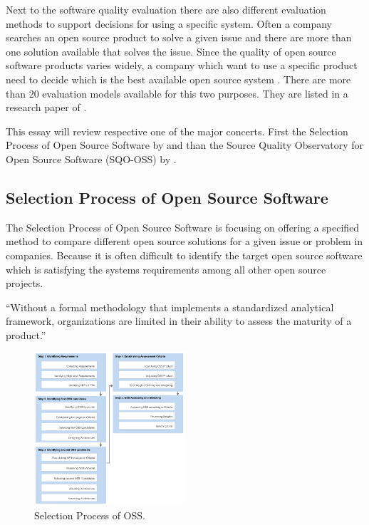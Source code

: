 \documentclass[DIV=calc,paper=a4,fontsize=9pt,twocolumn]{scrartcl}
\begin{document}
Next to the software quality evaluation there are also different evaluation methods to support decisions for using a specific system. Often a company searches an open source product to solve a given issue and there are more than one solution available that solves the issue. Since the quality of open source software products varies widely, a company which want to use a specific product need to decide which is the best available open source system \citep{stol2010comparison}. There are more than 20 evaluation models available for this two purposes. They are listed in a research paper of \citet{stol2010comparison}.

This essay will review respective one of the major concerts. First the Selection Process of Open Source Software by \citet{lee2007study} and than the Source Quality Observatory for Open Source Software (SQO-OSS) by \citet{samoladas2008sqo}.

\subsection{Selection Process of Open Source Software}

The Selection Process of Open Source Software is focusing on offering a specified method to compare different open source solutions for a given issue or problem in companies. Because it is often difficult to identify the target open source software which is satisfying the systems requirements among all other open source projects. \citep{lee2007study}

\enquote{Without a formal methodology that implements a standardized analytical framework, organizations are limited in their ability to assess the maturity of a product.} \citep{golden08}

\begin{figure}[ht]
    \includegraphics[width=0.5\textwidth ]{img/selectionprocess.png}{}
    \centering
    \caption{Selection Process of OSS. \citet{lee2007study}}\label{fig:selection-process.png}
\end{figure}
\end{document}
